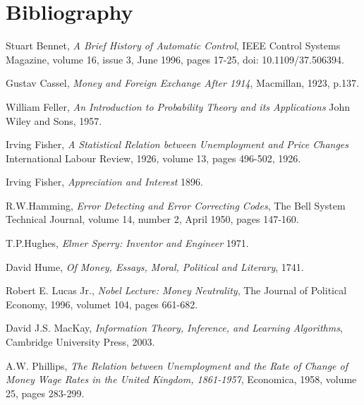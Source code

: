 \section{Bibliography}

\begin{thebibliography}{9}

    Stuart Bennet,
    \emph{A Brief History of Automatic Control},
    IEEE Control Systems Magazine,
    volume 16,
    issue 3,
    June 1996,
    pages 17-25,
    doi: 10.1109/37.506394.

    Gustav Cassel,
    \emph{Money and Foreign Exchange After 1914},
    Macmillan,
    1923,
    p.137.

    William Feller,
    \emph{An Introduction to Probability Theory and its Applications}
    John Wiley and Sons,
    1957.

    Irving Fisher, 
        \emph{A Statistical Relation between Unemployment and Price Changes}
        International Labour Review,
        1926,
        volume 13,
        pages 496-502,
        1926.

    Irving Fisher,
        \emph{Appreciation and Interest}
        1896.

    R.W.Hamming,
        \emph{Error Detecting and Error Correcting Codes},
        The Bell System Technical Journal,
        volume 14,
        number 2,
        April 1950,
        pages 147-160.

    T.P.Hughes,
        \emph{Elmer Sperry: Inventor and Engineer}
        1971.

    David Hume,
        \emph{Of Money, Essays, Moral, Political and Literary},
        1741.

    Robert E. Lucas Jr.,
        \emph{Nobel Lecture: Money Neutrality},
        The Journal of Political Economy,
        1996,
        volumet 104,
        pages 661-682.

    David J.S. MacKay,
        \emph{Information Theory, Inference, and Learning Algorithms},
        Cambridge University Press,
        2003.

    A.W. Phillips,
        \emph{The Relation between Unemployment and the Rate of Change of Money Wage Rates in the United Kingdom, 1861-1957},
        Economica,
        1958,
        volume 25,
        pages 283-299.


\end{thebibliography}
